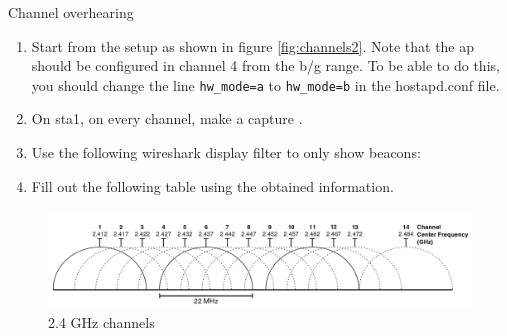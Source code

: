 \begin{exercise}{Channel overhearing}
	\begin{enumerate}
		\item Start from the setup as shown in figure \ref{fig:channels2}. \newline
		\remark Note that the \ac{ap} should be configured in channel 4 from the b/g range. To be able to do this, you should change the line \verb!hw_mode=a! to \verb!hw_mode=b! in the hostapd.conf file.
		\item On \ac{sta}1, on every channel, make a capture .\newline
		\item Use the following wireshark display filter to only show beacons:\newline
		\item Fill out the following table using the obtained information.\newline
		\begin{esolution}
		\end{esolution}
		

		\end{enumerate}
\end{exercise}

\begin{figure}[h!]
	\begin{center}
		\includegraphics[width=\textwidth]{images/bgchannels.pdf}
		\caption{2.4 GHz channels} 
		\label{fig:channel_separation} 
	\end{center}
\end{figure}

